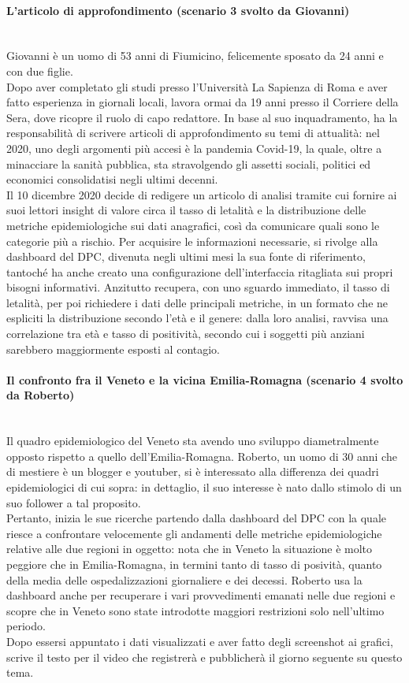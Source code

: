 \paragraph{L'articolo di approfondimento (scenario 3 svolto da Giovanni)}\mbox{}\\
Giovanni è un uomo di 53 anni di Fiumicino, felicemente sposato da 24 anni e con due figlie.\\
Dopo aver completato gli studi presso l'Università La Sapienza di Roma e aver fatto esperienza in giornali locali, lavora ormai da 19 anni presso il Corriere della Sera, dove ricopre il ruolo di capo redattore.
In base al suo inquadramento, ha la responsabilità di scrivere articoli di approfondimento su temi di attualità: nel 2020, uno degli argomenti più accesi è la pandemia Covid-19, la quale, oltre a minacciare la sanità pubblica, sta stravolgendo gli assetti sociali, politici ed economici consolidatisi negli ultimi decenni.\\
Il 10 dicembre 2020 decide di redigere un articolo di analisi tramite cui fornire ai suoi lettori insight di valore circa il tasso di letalità e la distribuzione delle metriche epidemiologiche sui dati anagrafici, così da comunicare quali sono le categorie più a rischio.
Per acquisire le informazioni necessarie, si rivolge alla dashboard del DPC, divenuta negli ultimi mesi la sua fonte di riferimento, tantoché ha anche creato una configurazione dell'interfaccia ritagliata sui propri bisogni informativi.
Anzitutto recupera, con uno sguardo immediato, il tasso di letalità, per poi richiedere i dati delle principali metriche, in un formato che ne espliciti la distribuzione secondo l'età e il genere: dalla loro analisi, ravvisa una correlazione tra età e tasso di positività, secondo cui i soggetti più anziani sarebbero maggiormente esposti al contagio. 
\noindent
\paragraph{Il confronto fra il Veneto e la vicina Emilia-Romagna (scenario 4 svolto da Roberto)}\mbox{}\\
Il quadro epidemiologico del Veneto sta avendo uno sviluppo diametralmente opposto rispetto a quello dell'Emilia-Romagna.
Roberto, un uomo di 30 anni che di mestiere è un blogger e youtuber, si è interessato alla differenza dei quadri epidemiologici di cui sopra: in dettaglio, il suo interesse è nato dallo stimolo di un suo follower a tal proposito.\\
Pertanto, inizia le sue ricerche partendo dalla dashboard del DPC con la quale riesce a confrontare velocemente gli andamenti delle metriche epidemiologiche relative alle due regioni in oggetto: nota che in Veneto la situazione è molto peggiore che in Emilia-Romagna, in termini tanto di tasso di posività, quanto della media delle ospedalizzazioni giornaliere e dei decessi.
Roberto usa la dashboard anche per recuperare i vari provvedimenti emanati nelle due regioni e scopre che in Veneto sono state introdotte maggiori restrizioni solo nell'ultimo periodo. \\
Dopo essersi appuntato i dati visualizzati e aver fatto degli screenshot ai grafici, scrive il testo per il video che registrerà e pubblicherà il giorno seguente su questo tema.
\noindent
